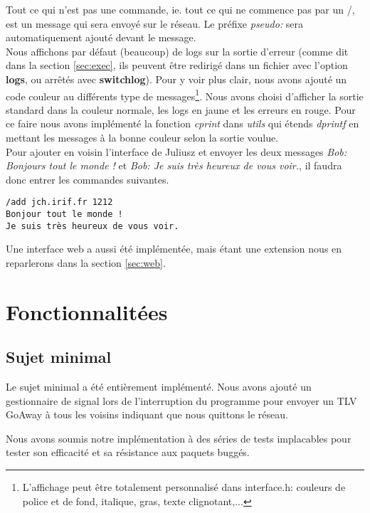 \documentclass[a4paper,10pt]{article} %
\begin{document}
Tout ce qui n'est pas une commande, ie. tout ce qui ne commence pas par un \textrm{/}, est un message qui sera envoyé sur le réseau. Le préfixe \textit{pseudo: } sera automatiquement ajouté devant le message.\\

Nous affichons par défaut (beaucoup) de logs sur la sortie d'erreur (comme dit dans la section \ref{sec:exec}, ils peuvent être redirigé dans un fichier avec l'option \textbf{logs}, ou arrêtés avec \textbf{switchlog}). Pour y voir plus clair, nous avons ajouté un code couleur au différents type de messages\footnote{L'affichage peut être totalement personnalisé dans \textrm{interface.h}: couleurs de police et de fond, italique, gras, texte clignotant,...}. Nous avons choisi d'afficher la sortie standard dans la couleur normale, les logs en jaune et les erreurs en rouge. Pour ce faire nous avons implémenté la fonction \textit{cprint} dans \textit{utils} qui étends \textit{dprintf} en mettant les messages à la bonne couleur selon la sortie voulue.\\

Pour ajouter en voisin l'interface de Juliusz et envoyer les deux messages \textit{Bob: Bonjours tout le monde !} et \textit{Bob: Je suis très heureux de vous voir.}, il faudra donc entrer les commandes suivantes.

\begin{verbatim}
/add jch.irif.fr 1212
Bonjour tout le monde !
Je suis très heureux de vous voir.
\end{verbatim}

Une interface web a aussi été implémentée, mais étant une extension nous en reparlerons dans la section \ref{sec:web}.

\section{Fonctionnalitées}

\subsection{Sujet minimal}
Le sujet minimal a été entièrement implémenté.
Nous avons ajouté un gestionnaire de signal lors de l'interruption du programme pour envoyer un TLV GoAway à tous les voisins indiquant que nous quittons le réseau.

Nous avons soumis notre implémentation à des séries de tests implacables pour tester son efficacité et sa résistance aux paquets buggés.
\end{document}
